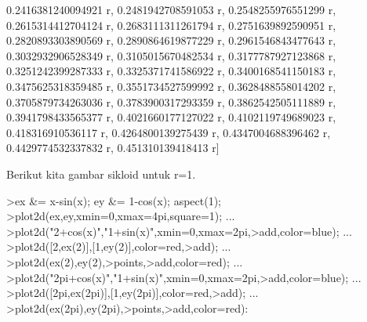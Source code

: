 \documentclass[12pt,arial,letterpaper]{book}
\begin{document}
\begin{eulernootebook}
\begin{eulercomment}
\begin{eulercomment}
\begin{eulernootebook}
\begin{eulercomment}
\begin{eulercomment}
\begin{eulercomment}
\begin{eulercomment}
\begin{eulercomment}
\begin{eulercomment}
\begin{eulernotebook}
\begin{eulercomment}
\begin{eulercomment}
\begin{eulercomment}
\begin{eulercomment}
\begin{eulercomment}
\begin{eulercomment}
\begin{eulercomment}
\begin{eulercomment}
\begin{eulercomment}
\begin{eulercomment}
\begin{eulercomment}
\begin{eulercomment}
\begin{eulercomment}
\begin{eulercomment}
\begin{eulercomment}
\begin{eulercomment}
\begin{euleroutput}
  0.2416381240094921 r, 0.2481942708591053 r, 0.2548255976551299 r, 
  0.2615314412704124 r, 0.2683111311261794 r, 0.2751639892590951 r, 
  0.2820893303890569 r, 0.2890864619877229 r, 0.2961546843477643 r, 
  0.3032932906528349 r, 0.3105015670482534 r, 0.3177787927123868 r, 
  0.3251242399287333 r, 0.3325371741586922 r, 0.3400168541150183 r, 
  0.3475625318359485 r, 0.3551734527599992 r, 0.3628488558014202 r, 
  0.3705879734263036 r, 0.3783900317293359 r, 0.3862542505111889 r, 
  0.3941798433565377 r, 0.4021660177127022 r, 0.4102119749689023 r, 
  0.418316910536117 r, 0.4264800139275439 r, 0.4347004688396462 r, 
  0.4429774532337832 r, 0.451310139418413 r]
  
\end{euleroutput}
\begin{eulercomment}
Berikut kita gambar sikloid untuk r=1.
\end{eulercomment}
\begin{eulerprompt}
>ex &= x-sin(x); ey &= 1-cos(x); aspect(1);
>plot2d(ex,ey,xmin=0,xmax=4pi,square=1); ...
>plot2d("2+cos(x)","1+sin(x)",xmin=0,xmax=2pi,>add,color=blue); ...
>plot2d([2,ex(2)],[1,ey(2)],color=red,>add); ...
>plot2d(ex(2),ey(2),>points,>add,color=red); ...
>plot2d("2pi+cos(x)","1+sin(x)",xmin=0,xmax=2pi,>add,color=blue); ...
>plot2d([2pi,ex(2pi)],[1,ey(2pi)],color=red,>add); ...
>plot2d(ex(2pi),ey(2pi),>points,>add,color=red):
\end{eulerprompt}
\begin{euleroutput}

\end{euleroutput}
\end{eulercomment}
\end{eulercomment}
\end{eulercomment}
\end{eulercomment}
\end{eulercomment}
\end{eulercomment}
\end{eulercomment}
\end{eulercomment}
\end{eulercomment}
\end{eulercomment}
\end{eulercomment}
\end{eulercomment}
\end{eulercomment}
\end{eulercomment}
\end{eulercomment}
\end{eulercomment}
\end{eulernotebook}
\end{eulercomment}
\end{eulercomment}
\end{eulercomment}
\end{eulercomment}
\end{eulercomment}
\end{eulercomment}
\end{eulernootebook}
\end{eulercomment}
\end{eulercomment}
\end{eulernootebook}
\end{document}
